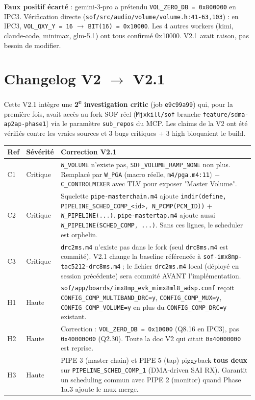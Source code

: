 \documentclass[11pt,a4paper]{article}
\begin{document}
\textbf{Faux positif écarté} : gemini-3-pro a prétendu \texttt{VOL\_ZERO\_DB = 0x800000} en IPC3. Vérification directe (\texttt{sof/src/audio/volume/volume.h:41-63,103}) : en IPC3, \texttt{VOL\_QXY\_Y = 16} $\rightarrow$ \texttt{BIT(16) = 0x10000}. Les 4 autres workers (kimi, claude-code, minimax, glm-5.1) ont tous confirmé 0x10000. V2.1 avait raison, pas besoin de modifier.

\clearpage

\section*{Changelog V2 $\rightarrow$ V2.1}

Cette V2.1 intègre une \textbf{2\textsuperscript{e} investigation critic} (job \texttt{e9c99a99}) qui, pour la première fois, avait accès au fork SOF réel (\texttt{Mjxkill/sof} branche \texttt{feature/sdma-ap2ap-phase1}) via le paramètre \texttt{sub\_repos} du MCP. Les claims de la V2 ont été vérifiés contre les vraies sources et 3 bugs critiques + 3 high bloquaient le build.

\begin{center}
\begin{tabularx}{\textwidth}{llX}
\toprule
\textbf{Ref} & \textbf{Sévérité} & \textbf{Correction V2.1} \\
\midrule
C1 & Critique & \texttt{W\_VOLUME} n'existe pas, \texttt{SOF\_VOLUME\_RAMP\_NONE} non plus. Remplacé par \texttt{W\_PGA} (macro réelle, \texttt{m4/pga.m4:11}) + \texttt{C\_CONTROLMIXER} avec TLV pour exposer "Master Volume". \\
C2 & Critique & Squelette \texttt{pipe-masterchain.m4} ajoute \texttt{indir(define, PIPELINE\_SCHED\_COMP\_<id>, N\_PCMP(PCM\_ID))} + \texttt{W\_PIPELINE(...)}. \texttt{pipe-mastertap.m4} ajoute aussi \texttt{W\_PIPELINE(SCHED\_COMP, ...)}. Sans ces lignes, le scheduler est orphelin. \\
C3 & Critique & \texttt{drc2ms.m4} n'existe pas dans le fork (seul \texttt{drc8ms.m4} est commité). V2.1 change la baseline référencée à \texttt{sof-imx8mp-tac5212-drc8ms.m4} ; le fichier \texttt{drc2ms.m4} local (déployé en session précédente) sera commité AVANT l'implémentation. \\
H1 & Haute & \texttt{sof/app/boards/imx8mp\_evk\_mimx8ml8\_adsp.conf} reçoit \texttt{CONFIG\_COMP\_MULTIBAND\_DRC=y}, \texttt{CONFIG\_COMP\_MUX=y}, \texttt{CONFIG\_COMP\_VOLUME=y} en plus du \texttt{CONFIG\_COMP\_DRC=y} existant. \\
H2 & Haute & Correction : \texttt{VOL\_ZERO\_DB = 0x10000} (Q8.16 en IPC3), pas \texttt{0x40000000} (Q2.30). Toute la doc V2 qui citait \texttt{0x40000000} est reprise. \\
H3 & Haute & PIPE 3 (master chain) et PIPE 5 (tap) piggyback \textbf{tous deux} sur \texttt{PIPELINE\_SCHED\_COMP\_1} (DMA-driven SAI RX). Garantit un scheduling commun avec PIPE 2 (monitor) quand Phase 1a.3 ajoute le mux merge. \\
\bottomrule
\end{tabularx}
\end{center}
\end{document}
